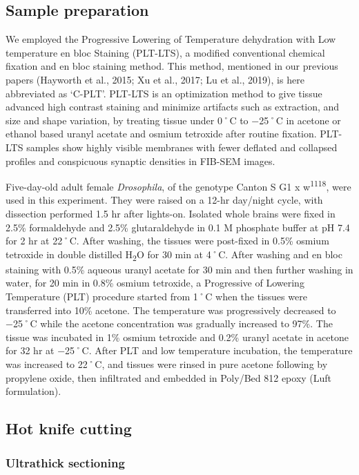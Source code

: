 \documentclass{article}
\begin{document}
\subsection*{Sample preparation}

We employed the Progressive Lowering of Temperature dehydration with Low temperature en bloc Staining (PLT-LTS), a modified conventional chemical fixation and en bloc staining method. This method, mentioned in our previous papers (Hayworth et al., 2015; Xu et al., 2017; Lu et al., 2019), is here abbreviated as ‘C-PLT’. PLT-LTS is an optimization method to give tissue advanced high contrast staining and minimize artifacts such as extraction, and size and shape variation, by treating tissue under 0˚C to −25˚C in acetone or ethanol based uranyl acetate and osmium tetroxide after routine fixation. PLT-LTS samples show highly visible membranes with fewer deflated and collapsed profiles and conspicuous synaptic densities in FIB-SEM images.

Five-day-old adult female \emph{Drosophila}, of the genotype Canton S G1 x w\textsuperscript{1118}, were used in this experiment. They were raised on a 12-hr day/night cycle, with dissection performed 1.5 hr after lights-on. Isolated whole brains were fixed in 2.5\% formaldehyde and 2.5\% glutaraldehyde in 0.1 M phosphate buffer at pH 7.4 for 2 hr at 22˚C. After washing, the tissues were post-fixed in 0.5\% osmium tetroxide in double distilled H\textsubscript{2}O for 30 min at 4˚C. After washing and en bloc staining with 0.5\% aqueous uranyl acetate for 30 min and then further washing in water, for 20 min in 0.8\% osmium tetroxide, a Progressive of Lowering Temperature (PLT) procedure started from 1˚C when the tissues were transferred into 10\% acetone. The temperature was progressively decreased to −25˚C while the acetone concentration was gradually increased to 97\%. The tissue was incubated in 1\% osmium tetroxide and 0.2\% uranyl acetate in acetone for 32 hr at −25˚C. After PLT and low temperature incubation, the temperature was increased to 22˚C, and tissues were rinsed in pure acetone following by propylene oxide, then infiltrated and embedded in Poly/Bed 812 epoxy (Luft formulation).

\subsection*{Hot knife cutting}

\subsubsection*{Ultrathick sectioning}
\end{document}
